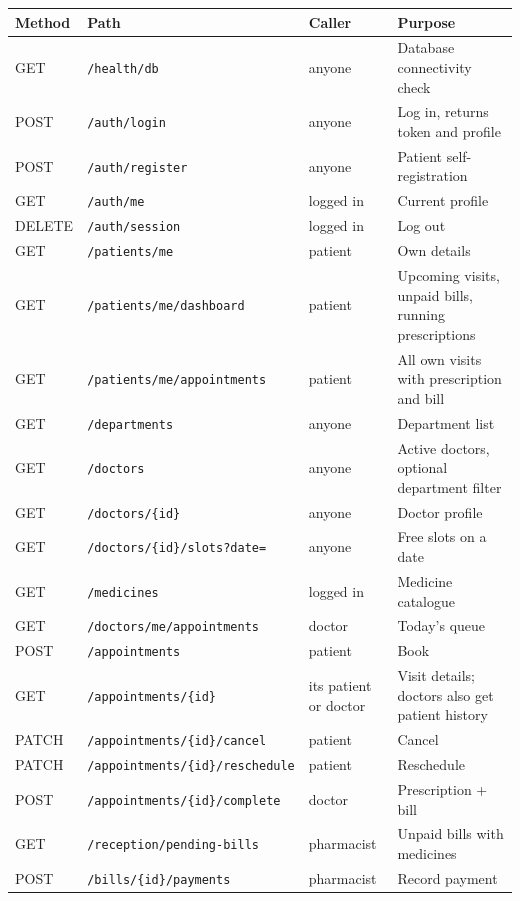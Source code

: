 \documentclass[11pt,a4paper]{article}
\newcommand{\code}[1]{\texttt{#1}}
\begin{document}
\begin{center}
\footnotesize
\begin{tabularx}{\textwidth}{l l l L}
\toprule
\textbf{Method} & \textbf{Path} & \textbf{Caller} & \textbf{Purpose} \\
\midrule
GET    & \code{/health/db}                        & anyone     & Database connectivity check \\
POST   & \code{/auth/login}                       & anyone     & Log in, returns token and profile \\
POST   & \code{/auth/register}                    & anyone     & Patient self-registration \\
GET    & \code{/auth/me}                          & logged in  & Current profile \\
DELETE & \code{/auth/session}                     & logged in  & Log out \\
GET    & \code{/patients/me}                      & patient    & Own details \\
GET    & \code{/patients/me/dashboard}            & patient    & Upcoming visits, unpaid bills, running prescriptions \\
GET    & \code{/patients/me/appointments}         & patient    & All own visits with prescription and bill \\
GET    & \code{/departments}                      & anyone     & Department list \\
GET    & \code{/doctors}                          & anyone     & Active doctors, optional department filter \\
GET    & \code{/doctors/\{id\}}                   & anyone     & Doctor profile \\
GET    & \code{/doctors/\{id\}/slots?date=}       & anyone     & Free slots on a date \\
GET    & \code{/medicines}                        & logged in  & Medicine catalogue \\
GET    & \code{/doctors/me/appointments}          & doctor     & Today's queue \\
POST   & \code{/appointments}                     & patient    & Book \\
GET    & \code{/appointments/\{id\}}              & its patient or doctor & Visit details; doctors also get patient history \\
PATCH  & \code{/appointments/\{id\}/cancel}       & patient    & Cancel \\
PATCH  & \code{/appointments/\{id\}/reschedule}   & patient    & Reschedule \\
POST   & \code{/appointments/\{id\}/complete}     & doctor     & Prescription + bill \\
GET    & \code{/reception/pending-bills}          & pharmacist & Unpaid bills with medicines \\
POST   & \code{/bills/\{id\}/payments}            & pharmacist & Record payment \\
\bottomrule
\end{tabularx}
\end{center}
\end{document}
